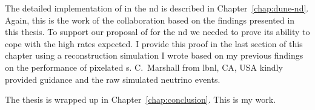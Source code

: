 The detailed implementation of \AC{} in the \dune{} \gls{nd} is described in Chapter~\ref{chap:dune-nd}.
Again, this is the work of the \AC{} collaboration based on the findings presented in this thesis.
To support our proposal of \AC{} for the \dune{} \gls{nd} we needed to prove its ability to cope with the high rates expected.
I provide this proof in the last section of this chapter using a reconstruction simulation I wrote based on my previous findings on the performance of pixelated \lartpc{}s.
C.\ Marshall from \gls{lbnl}, CA, USA kindly provided guidance and the raw simulated neutrino events.

The thesis is wrapped up in Chapter~\ref{chap:conclusion}.
This is my work.